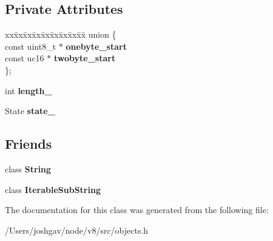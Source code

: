 \subsection*{Private Attributes}
\begin{DoxyCompactItemize}
\item 
\begin{tabbing}
xx\=xx\=xx\=xx\=xx\=xx\=xx\=xx\=xx\=\kill
union \{\\
\>const uint8\_t $\ast$ {\bfseries onebyte\_start}\\
\>const uc16 $\ast$ {\bfseries twobyte\_start}\\
\}; \hypertarget{classv8_1_1internal_1_1_string_1_1_flat_content_a8a92bb13524f94bfcd7784b327b535a5}{}\label{classv8_1_1internal_1_1_string_1_1_flat_content_a8a92bb13524f94bfcd7784b327b535a5}
\\

\end{tabbing}\item 
int {\bfseries length\+\_\+}\hypertarget{classv8_1_1internal_1_1_string_1_1_flat_content_ac5869cc96cbbf4fe59c8ec2a34367077}{}\label{classv8_1_1internal_1_1_string_1_1_flat_content_ac5869cc96cbbf4fe59c8ec2a34367077}

\item 
State {\bfseries state\+\_\+}\hypertarget{classv8_1_1internal_1_1_string_1_1_flat_content_ac33d8dce55ff3be0b52d03c12a2db33f}{}\label{classv8_1_1internal_1_1_string_1_1_flat_content_ac33d8dce55ff3be0b52d03c12a2db33f}

\end{DoxyCompactItemize}
\subsection*{Friends}
\begin{DoxyCompactItemize}
\item 
class {\bfseries String}\hypertarget{classv8_1_1internal_1_1_string_1_1_flat_content_a7fb804f7dc96dd9f705c84095f37f1ca}{}\label{classv8_1_1internal_1_1_string_1_1_flat_content_a7fb804f7dc96dd9f705c84095f37f1ca}

\item 
class {\bfseries Iterable\+Sub\+String}\hypertarget{classv8_1_1internal_1_1_string_1_1_flat_content_ae46cd6f0ea9e1edb46e2f776d1db15fb}{}\label{classv8_1_1internal_1_1_string_1_1_flat_content_ae46cd6f0ea9e1edb46e2f776d1db15fb}

\end{DoxyCompactItemize}


The documentation for this class was generated from the following file\+:\begin{DoxyCompactItemize}
\item 
/\+Users/joshgav/node/v8/src/objects.\+h\end{DoxyCompactItemize}
